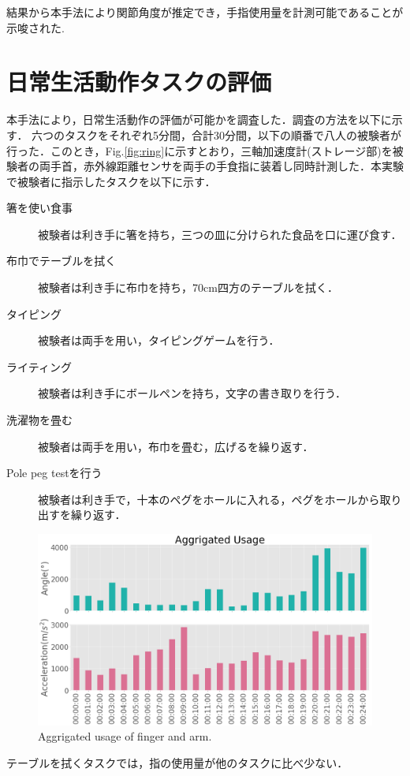 結果から本手法により関節角度が推定でき，手指使用量を計測可能であることが示唆された.

\section{日常生活動作タスクの評価}
本手法により，日常生活動作の評価が可能かを調査した．調査の方法を以下に示す．
六つのタスクをそれぞれ5分間，合計30分間，以下の順番で八人の被験者が行った．このとき，Fig.\ref{fig:ring}に示すとおり，三軸加速度計(ストレージ部)を被験者の両手首，赤外線距離センサを両手の手食指に装着し同時計測した．本実験で被験者に指示したタスクを以下に示す．

\begin{description}
\item[箸を使い食事]
被験者は利き手に箸を持ち，三つの皿に分けられた食品を口に運び食す．

\item[布巾でテーブルを拭く]
被験者は利き手に布巾を持ち，70cm四方のテーブルを拭く．

\item[タイピング]
被験者は両手を用い，タイピングゲームを行う．

\item[ライティング]
被験者は利き手にボールペンを持ち，文字の書き取りを行う．

\item[洗濯物を畳む]
被験者は両手を用い，布巾を畳む，広げるを繰り返す．

\item[Pole peg testを行う]
被験者は利き手で，十本のペグをホールに入れる，ペグをホールから取り出すを繰り返す．

\end{description}


\begin{figure}[H]
  \centering
  \includegraphics[width=0.8\linewidth]{fig/result}
  \caption{Aggrigated usage of finger and arm. }
  \label{fig:usage}
\end{figure}


テーブルを拭くタスクでは，指の使用量が他のタスクに比べ少ない．
